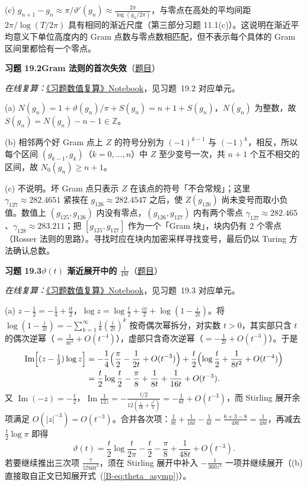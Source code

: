 \documentclass[11pt,a4paper]{article}
\renewcommand{\Im}{\operatorname{Im}}
\newcommand{\bref}[1]{\ref*{B-#1}}
\newcommand{\Sol}[2]{%
  \par\addvspace{1.2em}\noindent
  \hypertarget{s:#1}{}\textbf{习题 #1\quad #2}\hfill{\small（\hyperlink{q:#1}{题目}）}\par
  \nopagebreak\smallskip}
\begin{document}
(c) $g_{n+1}-g_n\approx\pi/\vartheta'(g_n)\approx\frac{2\pi}{\log(g_n/2\pi)}$，与零点在高处的平均间距 $2\pi/\log(T/2\pi)$ 具有相同的渐近尺度（第三部分习题 11.1(c)）。这说明在渐近平均意义下单位高度内的 Gram 点数与零点数相匹配，但不表示每个具体的 Gram 区间里都恰有一个零点。

\Sol{19.2}{Gram 法则的首次失效}
\emph{在线复算：}\href{https://colab.research.google.com/github/lichengtong123/lichengtong-RH/blob/main/\%E4\%B9\%A0\%E9\%A2\%98\%E4\%B8\%8E\%E8\%A7\%A3\%E7\%AD\%94/\%E4\%B9\%A0\%E9\%A2\%98\%E6\%95\%B0\%E5\%80\%BC\%E5\%A4\%8D\%E7\%AE\%97.ipynb}{《习题数值复算》Notebook}，见习题~19.2 对应单元。

(a) $N(g_n)=1+\vartheta(g_n)/\pi+S(g_n)=n+1+S(g_n)$，$N(g_n)$ 为整数，故 $S(g_n)=N(g_n)-n-1\in\mathbb Z$。

(b) 相邻两个好 Gram 点上 $Z$ 的符号分别为 $(-1)^{k-1}$ 与 $(-1)^k$，相反，所以每个区间 $(g_{k-1},g_k)$（$k=0,\dots,n$）中 $Z$ 至少变号一次，共 $n+1$ 个互不相交的区间，故 $N_0(g_n)\ge n+1$。

(c) 不说明。坏 Gram 点只表示 $Z$ 在该点的符号「不合常规」；这里 $\gamma_{127}\approx282.4651$ 紧挨在 $g_{126}\approx282.4547$ 之后，使 $Z(g_{126})$ 尚未变号而取小负值。数值上 $(g_{125},g_{126})$ 内没有零点，$(g_{126},g_{127})$ 内有两个零点 $\gamma_{127}\approx282.465$、$\gamma_{128}\approx283.211$；把 $[g_{125},g_{127}]$ 作为一个「Gram 块」，块内仍有 $2$ 个零点（Rosser 法则的思路）。寻找时应在块内加密采样寻找变号，最后仍以 Turing 方法确认总数。

\Sol{19.3}{$\vartheta(t)$ 渐近展开中的 $\frac1{48t}$}
\emph{在线复算：}\href{https://colab.research.google.com/github/lichengtong123/lichengtong-RH/blob/main/\%E4\%B9\%A0\%E9\%A2\%98\%E4\%B8\%8E\%E8\%A7\%A3\%E7\%AD\%94/\%E4\%B9\%A0\%E9\%A2\%98\%E6\%95\%B0\%E5\%80\%BC\%E5\%A4\%8D\%E7\%AE\%97.ipynb}{《习题数值复算》Notebook}，见习题~19.3 对应单元。

(a) $z-\frac12=-\frac14+\frac{it}2$，$\log z=\log\frac t2+\frac{i\pi}2+\log(1-\frac i{2t})$。将 $\log(1-\frac i{2t})=-\sum_{k=1}^\infty\frac1k(\frac i{2t})^k$ 按奇偶次幂拆分，对实数 $t>0$，其实部只含 $t$ 的偶次逆幂（$=\frac1{8t^2}+O(t^{-4})$），虚部只含奇次逆幂（$=-\frac1{2t}+O(t^{-3})$）。于是
\[
\begin{aligned}
  \Im\Bigl[(z-\tfrac12)\log z\Bigr]
  &=-\frac14\Bigl(\frac\pi2-\frac1{2t}+O(t^{-3})\Bigr)
   +\frac t2\Bigl(\log\frac t2+\frac1{8t^2}+O(t^{-4})\Bigr) \\
  &=\frac t2\log\frac t2-\frac\pi8+\frac1{8t}+\frac1{16t}+O(t^{-3}).
\end{aligned}
\]
又 $\Im(-z)=-\frac t2$，$\Im\frac1{12z}=-\frac{t/2}{12(\frac1{16}+\frac{t^2}4)}=-\frac1{6t}+O(t^{-3})$，而 Stirling 展开余项满足 $O(|z|^{-3})=O(t^{-3})$。合并各次项：$\frac1{8t}+\frac1{16t}-\frac1{6t}=\frac{6+3-8}{48t}=\frac1{48t}$，再减去 $\frac t2\log\pi$ 即得
\[
  \vartheta(t)=\frac t2\log\frac t{2\pi}-\frac t2-\frac\pi8+\frac1{48t}+O(t^{-3}).
\]
若要继续推出三次项 $\frac7{5760t^3}$，须在 Stirling 展开中补入 $-\frac1{360z^3}$ 一项并继续展开（(b) 直接取自正文已知展开式~(\bref{eq:theta_asymp})）。
\end{document}
